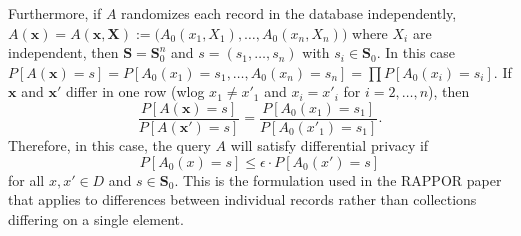 \documentclass[11pt,draft]{article}
\begin{document}


Furthermore, if $A$ randomizes each record in the database independently,
\ie $A(\boldsymbol{x}) = A(\boldsymbol{x}, \boldsymbol{X}) := 
\big(A_0(x_1, X_1),\dots,A_0(x_n,X_n)\big)$
where $X_i$ are independent,
then $\boldsymbol{S} = \boldsymbol{S}_0^n$ and $s = (s_1,\dots,s_n)$ with 
$s_i \in \boldsymbol{S}_0$. 
In this case
$P[A(\boldsymbol{x}) = s] = P[A_0(x_1) = s_1,\dots,A_0(x_n) = s_n]
= \prod P[A_0(x_i) = s_i]$.
If $\boldsymbol{x}$ and $\boldsymbol{x'}$ differ in one row (wlog $x_1 \neq x'_1$ and $x_i = x'_i$ for $i = 2,\dots,n$),
then
\[ \frac{P[A(\boldsymbol{x}) = s]}{P[A(\boldsymbol{x'}) = s]} = 
\frac{P[A_0(x_1) = s_1]}{P[A_0(x'_1) = s_1]}. \]
Therefore, in this case, the query $A$ will satisfy differential privacy if
\[ P[A_0(x) = s] \leq \epsilon \cdot P[A_0(x') = s] \]
for all $x,x' \in D$ and $s \in \boldsymbol{S}_0$.
This is the formulation used in the RAPPOR paper that applies to differences between individual records rather than collections differing on a single element.
\end{document}
